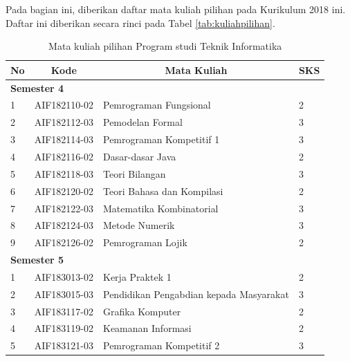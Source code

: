 Pada bagian ini, diberikan daftar mata kuliah pilihan pada Kurikulum 2018 ini. Daftar ini diberikan secara rinci pada Tabel \ref{tab:kuliahpilihan}.

\begin{table}[H]
	\centering
		\caption{Mata kuliah pilihan Program studi Teknik Informatika}
		\begin{tabular}{|p{0.5cm}|p{2.85cm}|p{4.95cm}|p{2.7cm}|}
			\hline
			\multicolumn{1}{|c|}{\textbf{No}} & \multicolumn{1}{c|}{\textbf{Kode}} & \multicolumn{1}{c|}{\textbf{Mata Kuliah}} & \multicolumn{1}{c|}{\textbf{SKS}} \\ \hline
\multicolumn{4}{|l|}{\textbf{Semester 4}}                                \\ \hline
1   & AIF182110-02    & Pemrograman Fungsional                     & 2   \\ \hline
2   & AIF182112-03    & Pemodelan Formal                           & 3   \\ \hline
3   & AIF182114-03    & Pemrograman Kompetitif 1                   & 3   \\ \hline
4   & AIF182116-02    & Dasar-dasar Java                           & 2   \\ \hline
5   & AIF182118-03    & Teori Bilangan                             & 3   \\ \hline
6   & AIF182120-02    & Teori Bahasa dan Kompilasi                 & 2   \\ \hline
7   & AIF182122-03    & Matematika Kombinatorial                   & 3   \\ \hline
8   & AIF182124-03    & Metode Numerik                             & 3   \\ \hline
9   & AIF182126-02    & Pemrograman Lojik                          & 2   \\ \hline
\multicolumn{4}{|l|}{\textbf{Semester 5}}                                \\ \hline
1   & AIF183013-02    & Kerja Praktek 1                            & 2   \\ \hline
2   & AIF183015-03    & Pendidikan Pengabdian kepada Masyarakat    & 3   \\ \hline
3   & AIF183117-02    & Grafika Komputer                           & 2   \\ \hline
4   & AIF183119-02    & Keamanan Informasi                         & 2   \\ \hline
5   & AIF183121-03    & Pemrograman Kompetitif 2                   & 3   \\ \hline

\end{tabular}
\end{table}
